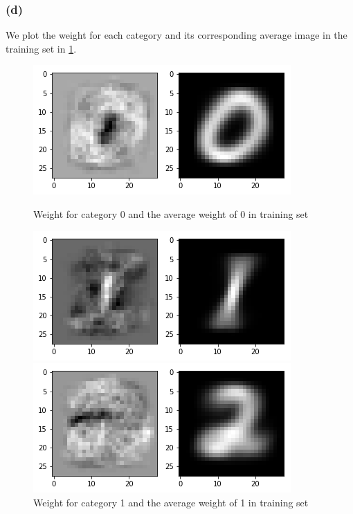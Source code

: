 \documentclass{article}
\begin{document}
\subsubsection{(d)}
We plot the weight for each category and its corresponding average image in the training set in \ref{pic1}. 
\begin{figure}[thbp]\label{pic1}
	\begin{minipage}{0.48\textwidth}
		\centering
		\includegraphics[width=\textwidth]{pics/0.png}
		\caption{Weight for category 0 and the average weight of 0 in training set}
	\end{minipage}\hfill
	\begin {minipage}{0.48\textwidth}
	\centering
	\includegraphics[width=\textwidth]{pics/1.png}
	\caption{Weight for category 1 and the average weight of 1 in training set}
\end{minipage}
	\begin{minipage}{0.48\textwidth}
		\centering
		\includegraphics[width=\textwidth]{pics/2.png}

\end{minipage}
\end{figure}
\end{document}
